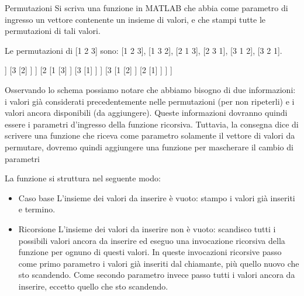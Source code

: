 \documentclass[format=169, handout]{beamer}
\begin{document}
\begin{frame}[allowframebreaks]{Permutazioni}
	Si scriva una funzione in MATLAB che abbia come parametro di ingresso un vettore contenente un insieme di valori, e che stampi tutte le permutazioni di
	tali valori.
	
	Le permutazioni di [1 2 3] sono:
	[1 2 3], [1 3 2], [2 1 3], [2 3 1], [3 1 2], [3 2 1].
	
	\begin{center}
	\begin{forest}
	[123
		[1
			[2
				[3]
			]
			[3
				[2]
			]
		]		
		[2
			[1
				[3]
			]
			[3
				[1]
			]
		]
		[3
			[1
				[2]
			]
			[2
				[1]
			]
		]	
	]
	\end{forest}
\end{center}

\framebreak
Osservando lo schema possiamo notare che abbiamo bisogno di due
informazioni: i valori già considerati precedentemente nelle permutazioni (per non ripeterli) e i valori ancora disponibili (da aggiungere). Queste informazioni dovranno quindi essere i parametri d'ingresso della funzione ricorsiva. Tuttavia, la consegna dice di scrivere una funzione che riceva come parametro solamente il vettore di valori da permutare, \alert{dovremo quindi aggiungere una funzione per mascherare il cambio di parametri}

\framebreak
La funzione si struttura nel seguente modo:
\begin{itemize}
	\item \alert{Caso base} L'insieme dei valori da inserire è vuoto: stampo i valori già inseriti e termino.
	\item \alert{Ricorsione} L'insieme dei valori da inserire non è vuoto: scandisco tutti i possibili valori
	ancora da inserire ed eseguo una invocazione ricorsiva della funzione per
	ognuno di questi valori. In queste invocazioni ricorsive passo come primo
	parametro i valori già inseriti dal chiamante, più quello nuovo che sto
	scandendo. Come secondo parametro invece passo tutti i valori ancora da
	inserire, eccetto quello che sto scandendo.
\end{itemize}
\end{frame}
\end{document}
